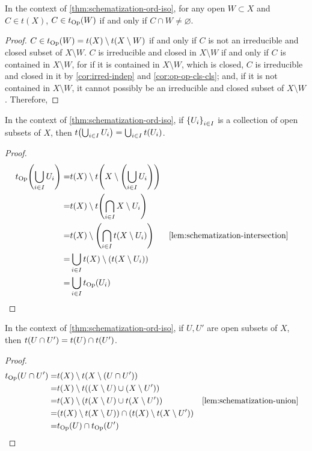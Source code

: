 \begin{lem}\label{lem:schemat-open-membership}
In the context of \cref{thm:schematization-ord-iso},
for any open $W \subset X$ and $C \in t(X)$,
$C \in t_{\mathrm{Op}}(W)$ if and only if $C \cap W \neq \varnothing$.
\end{lem}
\begin{proof}
$C \in t_{\mathrm{Op}}(W) = t(X) \setminus t(X \setminus W)$ if and only if
$C$ is not an irreducible and closed subset of $X \setminus W$.
$C$ is irreducible and closed in $X \setminus W$ if and only if
$C$ is contained in $X \setminus W$, for if it is contained
in $X \setminus W$, which is closed, $C$ is irreducible and closed
in it by \cref{cor:irred-indep} and \cref{cor:op-op-cls-cls}; and,
if it is not contained in $X \setminus W$, it cannot possibly
be an irreducible and closed subset of $X \setminus W$. Therefore,
\end{proof}

\begin{lem}\label{lem:schemat-ord-iso-union}
In the context of \cref{thm:schematization-ord-iso},
if $\set{U_i}_{i \in I}$ is a collection of open subsets of $X$,
then $t\br{\bigcup_{i \in I} U_i} = \bigcup_{i \in I} t(U_i)$.
\end{lem}
\begin{proof}
\begin{align*}
t_\Op\br{\bigcup_{i \in I} U_i}
=& t(X) \setminus t\br{X \setminus \br{\bigcup_{i \in I} U_i}} \\
=& t(X) \setminus t\br{\bigcap_{i \in I} X \setminus U_i} \\
=& t(X) \setminus \br{\bigcap_{i \in I} t\br{X \setminus U_i}}
    && \text{\cref{lem:schematization-intersection}} \\
=& \bigcup_{i \in I} t(X) \setminus \br{t\br{X \setminus U_i}} \\
=& \bigcup_{i \in I} t_\Op(U_i)
\end{align*}
\end{proof}

\begin{lem}\label{lem:schemat-ord-iso-intersection}
In the context of \cref{thm:schematization-ord-iso},
if $U, U'$ are open subsets of $X$,
then $t\br{U \cap U'} = t(U) \cap t(U')$.
\end{lem}
\begin{proof}
\begin{align*}
t_\Op(U \cap U')
=& t(X) \setminus t(X \setminus (U \cap U')) \\
=& t(X) \setminus t((X \setminus U) \cup (X \setminus U')) \\
=& t(X) \setminus (t(X \setminus U) \cup t(X \setminus U'))
    && \text{\cref{lem:schematization-union}} \\
=& (t(X) \setminus t(X \setminus U))
    \cap (t(X) \setminus t(X \setminus U')) \\
=& t_\Op(U) \cap t_\Op(U')
\end{align*}
\end{proof}

